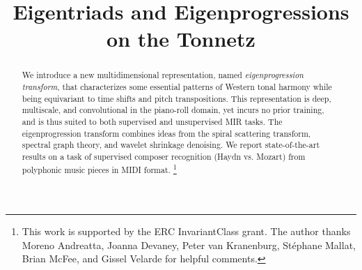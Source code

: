 \documentclass{article}
\title{Eigentriads and Eigenprogressions on the Tonnetz}
\makeatletter
\def\vs{vs.\@\xspace}
\newcommand\blfootnote[1]{%
  \begingroup
  \renewcommand\thefootnote{}\footnote{#1}%
  \addtocounter{footnote}{-1}%
  \endgroup
}
\makeatother
\begin{document}
%
\maketitle
%
\begin{abstract}
We introduce a new multidimensional representation,
named \emph{eigenprogression transform}, that characterizes some essential patterns of Western tonal harmony while being equivariant to time shifts and pitch transpositions.
This representation is deep, multiscale, and convolutional in the piano-roll domain, yet incurs no prior training, and is thus suited to both supervised and unsupervised MIR tasks.
The eigenprogression transform combines ideas from the spiral scattering transform, spectral graph theory, and wavelet shrinkage denoising.
We report state-of-the-art results on a task of supervised composer recognition (Haydn \vs{} Mozart) from polyphonic music pieces in MIDI format.
\blfootnote{This work is supported by the ERC InvariantClass grant.
The author thanks Moreno Andreatta, Joanna Devaney, Peter van Kranenburg, St\'{e}phane Mallat, Brian McFee, and Gissel Velarde for helpful comments.}
\end{abstract}
\end{document}
